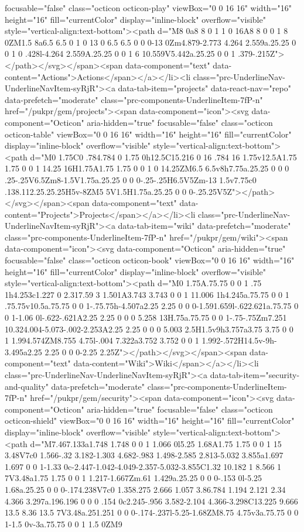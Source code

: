 focusable="false" class="octicon octicon-play" viewBox="0 0 16 16" width="16" height="16" fill="currentColor" display="inline-block" overflow="visible" style="vertical-align:text-bottom"><path d="M8 0a8 8 0 1 1 0 16A8 8 0 0 1 8 0ZM1.5 8a6.5 6.5 0 1 0 13 0 6.5 6.5 0 0 0-13 0Zm4.879-2.773 4.264 2.559a.25.25 0 0 1 0 .428l-4.264 2.559A.25.25 0 0 1 6 10.559V5.442a.25.25 0 0 1 .379-.215Z"></path></svg></span><span data-component="text" data-content="Actions">Actions</span></a></li><li class="prc-UnderlineNav-UnderlineNavItem-syRjR"><a data-tab-item="projects" data-react-nav="repo" data-prefetch="moderate" class="prc-components-UnderlineItem-7fP-n" href="/pukpr/gem/projects"><span data-component="icon"><svg data-component="Octicon" aria-hidden="true" focusable="false" class="octicon octicon-table" viewBox="0 0 16 16" width="16" height="16" fill="currentColor" display="inline-block" overflow="visible" style="vertical-align:text-bottom"><path d="M0 1.75C0 .784.784 0 1.75 0h12.5C15.216 0 16 .784 16 1.75v12.5A1.75 1.75 0 0 1 14.25 16H1.75A1.75 1.75 0 0 1 0 14.25ZM6.5 6.5v8h7.75a.25.25 0 0 0 .25-.25V6.5Zm8-1.5V1.75a.25.25 0 0 0-.25-.25H6.5V5Zm-13 1.5v7.75c0 .138.112.25.25.25H5v-8ZM5 5V1.5H1.75a.25.25 0 0 0-.25.25V5Z"></path></svg></span><span data-component="text" data-content="Projects">Projects</span></a></li><li class="prc-UnderlineNav-UnderlineNavItem-syRjR"><a data-tab-item="wiki" data-prefetch="moderate" class="prc-components-UnderlineItem-7fP-n" href="/pukpr/gem/wiki"><span data-component="icon"><svg data-component="Octicon" aria-hidden="true" focusable="false" class="octicon octicon-book" viewBox="0 0 16 16" width="16" height="16" fill="currentColor" display="inline-block" overflow="visible" style="vertical-align:text-bottom"><path d="M0 1.75A.75.75 0 0 1 .75 1h4.253c1.227 0 2.317.59 3 1.501A3.743 3.743 0 0 1 11.006 1h4.245a.75.75 0 0 1 .75.75v10.5a.75.75 0 0 1-.75.75h-4.507a2.25 2.25 0 0 0-1.591.659l-.622.621a.75.75 0 0 1-1.06 0l-.622-.621A2.25 2.25 0 0 0 5.258 13H.75a.75.75 0 0 1-.75-.75Zm7.251 10.324.004-5.073-.002-2.253A2.25 2.25 0 0 0 5.003 2.5H1.5v9h3.757a3.75 3.75 0 0 1 1.994.574ZM8.755 4.75l-.004 7.322a3.752 3.752 0 0 1 1.992-.572H14.5v-9h-3.495a2.25 2.25 0 0 0-2.25 2.25Z"></path></svg></span><span data-component="text" data-content="Wiki">Wiki</span></a></li><li class="prc-UnderlineNav-UnderlineNavItem-syRjR"><a data-tab-item="security-and-quality" data-prefetch="moderate" class="prc-components-UnderlineItem-7fP-n" href="/pukpr/gem/security"><span data-component="icon"><svg data-component="Octicon" aria-hidden="true" focusable="false" class="octicon octicon-shield" viewBox="0 0 16 16" width="16" height="16" fill="currentColor" display="inline-block" overflow="visible" style="vertical-align:text-bottom"><path d="M7.467.133a1.748 1.748 0 0 1 1.066 0l5.25 1.68A1.75 1.75 0 0 1 15 3.48V7c0 1.566-.32 3.182-1.303 4.682-.983 1.498-2.585 2.813-5.032 3.855a1.697 1.697 0 0 1-1.33 0c-2.447-1.042-4.049-2.357-5.032-3.855C1.32 10.182 1 8.566 1 7V3.48a1.75 1.75 0 0 1 1.217-1.667Zm.61 1.429a.25.25 0 0 0-.153 0l-5.25 1.68a.25.25 0 0 0-.174.238V7c0 1.358.275 2.666 1.057 3.86.784 1.194 2.121 2.34 4.366 3.297a.196.196 0 0 0 .154 0c2.245-.956 3.582-2.104 4.366-3.298C13.225 9.666 13.5 8.36 13.5 7V3.48a.251.251 0 0 0-.174-.237l-5.25-1.68ZM8.75 4.75v3a.75.75 0 0 1-1.5 0v-3a.75.75 0 0 1 1.5 0ZM9 